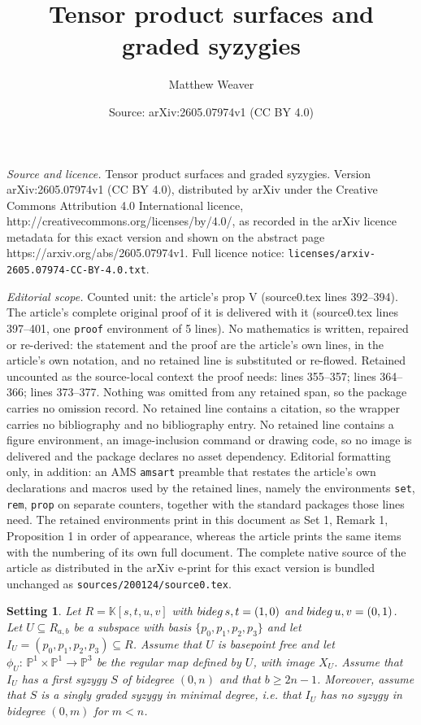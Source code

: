 \documentclass[10pt,a4paper]{amsart}
\title{Tensor product surfaces and graded syzygies}
\author{Matthew Weaver}
\date{Source: arXiv:2605.07974v1 (CC BY 4.0)}
\newtheorem{set}{Setting}
\def\K{\mathbb{K}}
\def\P{\mathbb{P}}
\def\bideg{\mathop{\rm bideg}}
\begin{document}
\maketitle

\noindent\emph{Source and licence.} Tensor product surfaces and graded syzygies. Version arXiv:2605.07974v1 (CC BY 4.0), distributed by arXiv under the Creative Commons Attribution 4.0 International licence, http://creativecommons.org/licenses/by/4.0/, as recorded in the arXiv licence metadata for this exact version and shown on the abstract page https://arxiv.org/abs/2605.07974v1. Full licence notice: \texttt{licenses/arxiv-2605.07974-CC-BY-4.0.txt}.\par\smallskip

\noindent\textit{Editorial scope.} Counted unit: the article's prop V (source0.tex lines 392--394). The article's complete original proof of it is delivered with it (source0.tex lines 397--401, one \texttt{proof} environment of 5 lines). No mathematics is written, repaired or re-derived: the statement and the proof are the article's own lines, in the article's own notation, and no retained line is substituted or re-flowed.  Retained uncounted as the source-local context the proof needs: lines 355--357; lines 364--366; lines 373--377.  Nothing was omitted from any retained span, so the package carries no omission record.  No retained line contains a citation, so the wrapper carries no bibliography and no bibliography entry.  No retained line contains a figure environment, an image-inclusion command or drawing code, so no image is delivered and the package declares no asset dependency.  Editorial formatting only, in addition: an AMS \texttt{amsart} preamble that restates the article's own declarations and macros used by the retained lines, namely the environments \texttt{set}, \texttt{rem}, \texttt{prop} on separate counters, together with the standard packages those lines need.  The retained environments print in this document as Set 1, Remark 1, Proposition 1 in order of appearance, whereas the article prints the same items with the numbering of its own full document.  The complete native source of the article as distributed in the arXiv e-print for this exact version is bundled unchanged as \texttt{sources/200124/source0.tex}.
\begin{set}\label{General Setting}
Let $R=\K[s,t,u,v]$ with $\bideg s,t =(1,0)$ and $\bideg u,v = (0,1)$. Let $U \subseteq R_{a,b}$ be a subspace with basis $\{p_0,p_1,p_2,p_3\}$ and let $I_U = (p_0,p_1,p_2,p_3) \subseteq R$. Assume that $U$ is basepoint free and let $\phi_U:\, \P^1\times \P^1 \longrightarrow \P^3$ be the regular map defined by $U$, with image $X_U$. Assume that $I_U$ has a first syzygy $S$ of bidegree $(0,n)$ and that $b\geq 2n-1$. Moreover, assume that $S$ is a singly graded syzygy in minimal degree, i.e. that $I_U$ has no syzygy in bidegree $(0,m)$ for $m<n$.
\end{set}
\end{document}
